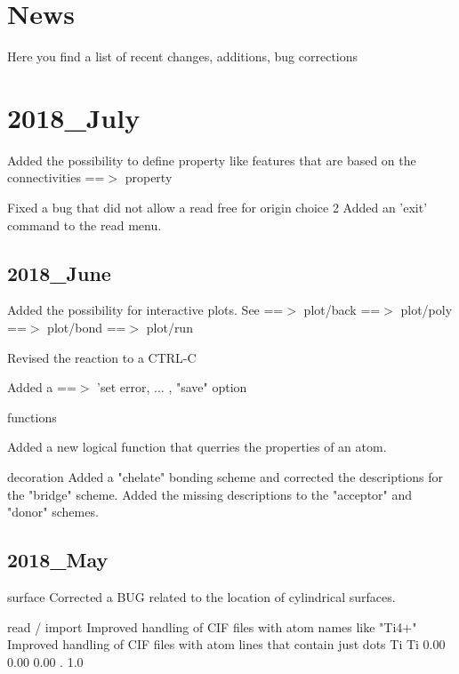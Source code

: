 \section{News}
\par
Here you find a list of recent changes, additions, bug corrections 
\section{2018\_July}
\par
Added the possibility to define property like features 
that are based on the connectivities ==$> $ property 
\par
Fixed a bug that did not allow a read free for origin choice 2 
Added an 'exit' command to the read menu. 
\subsection*{2018\_June}
\par
Added the possibility for interactive plots. 
See ==$> $ plot/back 
    ==$> $ plot/poly 
    ==$> $ plot/bond 
    ==$> $ plot/run 
\par
Revised the reaction to a CTRL-C 
\par
Added a ==$> $ 'set error, ... , "save" option 
\par
functions 
\par
Added a new logical function that querries the properties of an atom. 
\par
decoration 
Added a "chelate" bonding scheme and corrected the descriptions 
for the "bridge" scheme. 
Added the missing descriptions to the "acceptor" and "donor" 
schemes. 
\subsection*{2018\_May}
\par
surface 
Corrected a BUG related to the location of cylindrical surfaces. 
\par
read / import 
Improved handling of CIF files with atom names like "Ti4+" 
Improved handling of CIF files with atom lines that contain 
just dots 
Ti Ti 0.00 0.00 0.00 . 1.0 
